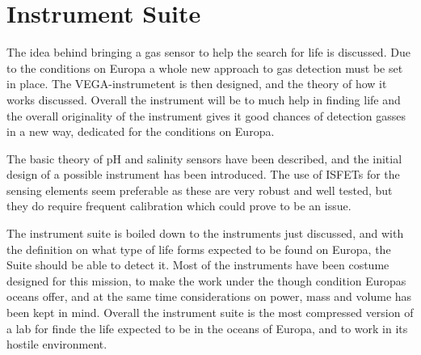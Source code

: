 \section{Instrument Suite}
The idea behind bringing a gas sensor to help the search for life is discussed. Due to the conditions on Europa a whole new approach to gas detection must be set in place. The VEGA-instrumetent is then designed, and the theory of how it works discussed. Overall the instrument will be to much help in finding life and the overall originality of the instrument gives it good chances of detection gasses in a new way, dedicated for the conditions on Europa.

The basic theory of pH and salinity sensors have been described, and the initial design of a possible instrument has been introduced. The use of ISFETs for the sensing elements seem preferable as these are very robust and well tested, but they do require frequent calibration which could prove to be an issue. 


The instrument suite is boiled down to the instruments just discussed, and with the definition on what type of life forms expected to be found on Europa, the Suite should be able to detect it. Most of the instruments have been costume designed for this mission, to make the work under the though condition Europas oceans offer, and at the same time considerations on power, mass and volume has been kept in mind. Overall the instrument suite is the most compressed version of a lab for finde the life expected to be in the oceans of Europa, and to work in its hostile environment.
